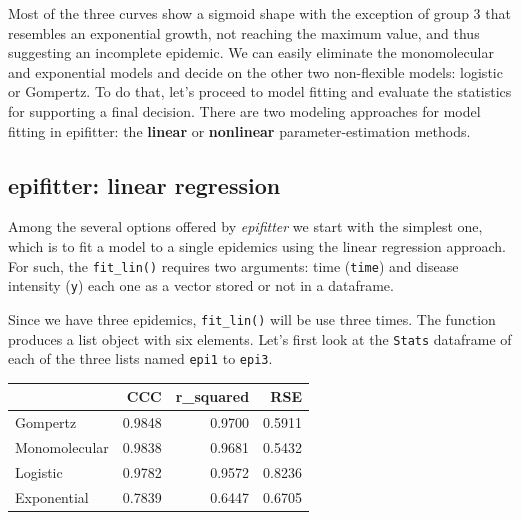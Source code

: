 \documentclass[
  letterpaper,
]{book}
\newenvironment{Shaded}{\begin{snugshade}}{\end{snugshade}}
\newcommand{\AttributeTok}[1]{\textcolor[rgb]{0.40,0.45,0.13}{#1}}
\newcommand{\FunctionTok}[1]{\textcolor[rgb]{0.28,0.35,0.67}{#1}}
\newcommand{\NormalTok}[1]{\textcolor[rgb]{0.00,0.23,0.31}{#1}}
\newcommand{\OtherTok}[1]{\textcolor[rgb]{0.00,0.23,0.31}{#1}}
\newcommand{\SpecialCharTok}[1]{\textcolor[rgb]{0.37,0.37,0.37}{#1}}
\newcommand{\StringTok}[1]{\textcolor[rgb]{0.13,0.47,0.30}{#1}}
\begin{document}
Most of the three curves show a sigmoid shape with the exception of
group 3 that resembles an exponential growth, not reaching the maximum
value, and thus suggesting an incomplete epidemic. We can easily
eliminate the monomolecular and exponential models and decide on the
other two non-flexible models: logistic or Gompertz. To do that, let's
proceed to model fitting and evaluate the statistics for supporting a
final decision. There are two modeling approaches for model fitting in
epifitter: the \textbf{linear} or \textbf{nonlinear}
parameter-estimation methods.

\hypertarget{epifitter-linear-regression}{%
\subsection{epifitter: linear
regression}\label{epifitter-linear-regression}}

Among the several options offered by \emph{epifitter} we start with the
simplest one, which is to fit a model to a single epidemics using the
linear regression approach. For such, the \texttt{fit\_lin()} requires
two arguments: time (\texttt{time}) and disease intensity (\texttt{y})
each one as a vector stored or not in a dataframe.

Since we have three epidemics, \texttt{fit\_lin()} will be use three
times. The function produces a list object with six elements. Let's
first look at the \texttt{Stats} dataframe of each of the three lists
named \texttt{epi1} to \texttt{epi3}.

\begin{Shaded}
\end{Shaded}

\begin{longtable}[]{@{}lrrr@{}}
\toprule\noalign{}
& CCC & r\_squared & RSE \\
\midrule\noalign{}
\endhead
\bottomrule\noalign{}
\endlastfoot
Gompertz & 0.9848 & 0.9700 & 0.5911 \\
Monomolecular & 0.9838 & 0.9681 & 0.5432 \\
Logistic & 0.9782 & 0.9572 & 0.8236 \\
Exponential & 0.7839 & 0.6447 & 0.6705 \\
\end{longtable}
\end{document}
